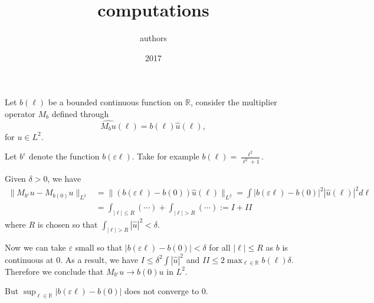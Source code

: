 \documentclass[letterpaper,11pt]{article}
\title{computations}
\author{authors}
\date{2017}
\newcommand{\R}{\mathbb{R}}
\newcommand{\eps}{\varepsilon}
\numberwithin{equation}{section}
\theoremstyle{plain}
\theoremstyle{remark}
\begin{document}
\maketitle

Let $b(\ell)$ be a bounded continuous function on $\R$, consider the multiplier operator $M_b$ defined through
\[
\widehat{M_b u}(\ell)  = b(\ell)\widehat{u}(\ell), 
\]
for $u \in L^2$.

Let $b^\eps$ denote the function $b(\eps \ell)$. Take for example $b(\ell) = \frac{\ell^2}{\ell^2+1}$. 

Given $\delta>0$, we have
\begin{align*}
\|M_{b^{\eps}} u - M_{b(0)} u \|_{L^2} &= \|(b(\eps\ell)-b(0))\widehat{u}(\ell)\|_{L^2} = \int |b(\eps\ell)-b(0)|^2|\widehat{u}(\ell)|^2 d\ell \\
&= \int_{|\ell |\le R}(\cdots)+\int_{|\ell | > R} (\cdots):= I + II
\end{align*}
where $R$ is chosen so that $\int_{|\ell|>R} |\widehat{u}|^2 < \delta$.

Now we can take $\eps$ small so that $|b(\eps \ell)-b(0)|<\delta$ for all $|\ell|\le R$ as $b$ is continuous at $0$. As a result, we have $I \le \delta^2 \int |\widehat{u}|^2$ and $II \le 2 \max_{\ell \in \R} b(\ell) \delta$. Therefore we conclude that $M_{b^\eps} u \to b(0) u$ in $L^2$. 

But $\sup_{\ell\in \R} |b(\eps\ell)-b(0)|$ does not converge to $0$.

 
\end{document}
